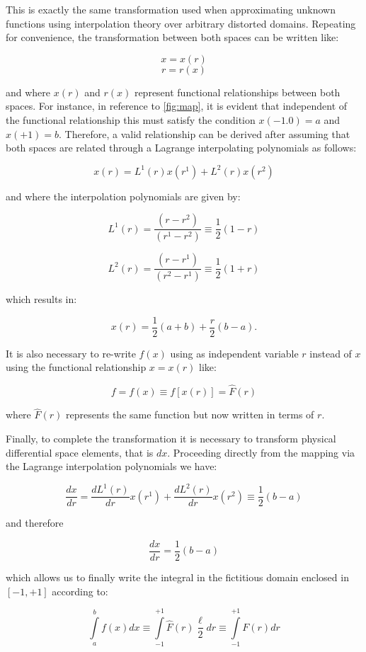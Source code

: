 This is exactly the same transformation used when approximating unknown functions using interpolation theory over arbitrary distorted domains. Repeating for convenience, the transformation between both spaces can be written like:

\[x = x(r)\]
\[r = r(x)\]

and where $x(r)$ and $r(x)$ represent functional relationships between both spaces. For instance, in reference to \cref{fig:map}, it is evident that independent of the functional relationship this must satisfy the condition $x(-1.0)=a$ and $x(+1)=b$. Therefore, a valid relationship can be derived after assuming that both spaces are related through a Lagrange interpolating polynomials as follows:

\[x(r) = {L^1}(r)x({r^1}) + {L^2}(r)x({r^2})\]


and where the interpolation polynomials are given by:


\[{L^1}(r) = \frac{{(r - {r^2})}}{{({r^1} - {r^2})}} \equiv \frac{1}{2}(1 - r)\]

\[{L^2}(r) = \frac{{(r - {r^1})}}{{({r^2} - {r^1})}} \equiv \frac{1}{2}(1 + r)\]

which results in:

\[x(r) = \frac{1}{2}(a + b) + \frac{r}{2}(b - a).\]


It is also necessary to re-write $f(x)$ using as independent variable $r$ instead of $x$ using the functional relationship $x=x(r)$ like:

\[f = f(x) \equiv f[x(r)] = \hat F(r)\]

where $\hat F(r)$ represents the same function but now written in terms of $r$.


Finally, to complete the transformation it is necessary to transform physical differential space elements, that is $dx$. Proceeding directly from the mapping via the Lagrange interpolation polynomials we have:



\[\frac{{dx}}{{dr}} = \frac{{d{L^1}(r)}}{{dr}}x({r^1}) + \frac{{d{L^2}(r)}}{{dr}}x({r^2}) \equiv \frac{1}{2}(b - a)\]

and therefore

\[\frac{{dx}}{{dr}} = \frac{1}{2}(b - a)\]

which allows us to finally write the integral in the fictitious domain enclosed in $[-1, +1]$ according to:

\[\int\limits_a^b {f(x)dx \equiv } \int\limits_{ - 1}^{ + 1} {\hat F(r)\frac{\ell}{2}dr}  \equiv \int\limits_{ - 1}^{ + 1} {F(r)dr} \]


